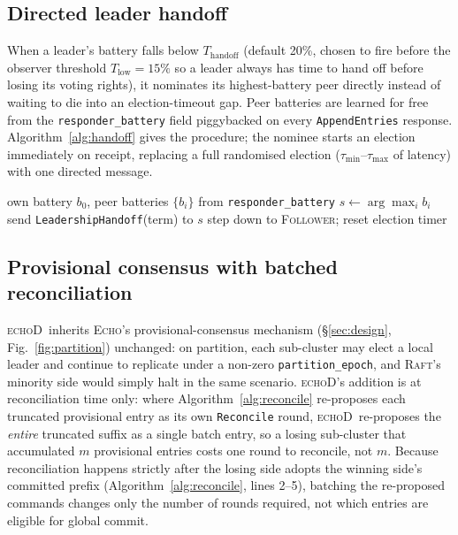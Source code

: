 \documentclass[conference]{IEEEtran}
\newcommand{\echoproto}{\textsc{Echo}\xspace}
\newcommand{\raftproto}{\textsc{Raft}\xspace}
\newcommand{\echodproto}{\textsc{echoD}\xspace}
\begin{document}
\subsection{Directed leader handoff}
When a leader's battery falls below $T_{\text{handoff}}$ (default
20\%, chosen to fire before the observer threshold $T_{\text{low}}{=}15\%$
so a leader always has time to hand off before losing its voting
rights), it nominates its highest-battery peer directly instead of
waiting to die into an election-timeout gap. Peer batteries are learned
for free from the \texttt{responder\_battery} field piggybacked on every
\texttt{AppendEntries} response. Algorithm~\ref{alg:handoff} gives the
procedure; the nominee starts an election immediately on receipt,
replacing a full randomised election ($\tau_{\min}$--$\tau_{\max}$ of
latency) with one directed message.

\begin{algorithm}[H]
\small
\caption{Directed leader handoff (leader side).}
\label{alg:handoff}
\begin{algorithmic}[1]
\REQUIRE own battery $b_0$, peer batteries $\{b_i\}$ from
  \texttt{responder\_battery}
  \STATE $s \leftarrow \arg\max_i b_i$ \hfill{}
    \STATE send \texttt{LeadershipHandoff}(term) to $s$
    \STATE step down to \textsc{Follower}; reset election timer
  \ENDIF
\ENDIF
\end{algorithmic}
\end{algorithm}

\subsection{Provisional consensus with batched reconciliation}
\echodproto\ inherits \echoproto's provisional-consensus mechanism
(\S\ref{sec:design}, Fig.~\ref{fig:partition}) unchanged: on partition,
each sub-cluster may elect a local leader and continue to replicate
under a non-zero \texttt{partition\_epoch}, and \raftproto's minority
side would simply halt in the same scenario. \echodproto's addition is
at reconciliation time only: where Algorithm~\ref{alg:reconcile} re-proposes
each truncated provisional entry as its own \texttt{Reconcile} round,
\echodproto\ re-proposes the \emph{entire} truncated suffix as a single
batch entry, so a losing sub-cluster that accumulated $m$ provisional
entries costs one round to reconcile, not $m$. Because reconciliation
happens strictly after the losing side adopts the winning side's
committed prefix (Algorithm~\ref{alg:reconcile}, lines 2--5), batching
the re-proposed commands changes only the number of rounds required,
not which entries are eligible for global commit.
\end{document}
